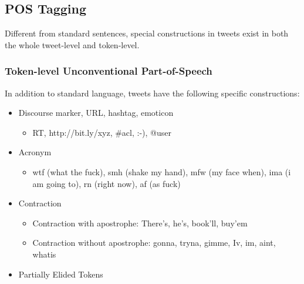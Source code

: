 \documentclass[11pt,letterpaper]{article}
\begin{document}
\subsection{POS Tagging}
Different from standard sentences, special constructions in tweets exist in both the whole tweet-level and token-level.

\subsubsection{Token-level Unconventional Part-of-Speech}
In addition to standard language, tweets have the following specific constructions:
\begin{itemize}
\item Discourse marker, URL, hashtag, emoticon
	\begin{itemize}
		\item RT, http://bit.ly/xyz, \#acl, :-), @user
	\end{itemize}
\item Acronym
	\begin{itemize}
		\item wtf (what the fuck), smh (shake my hand), mfw (my face when), ima (i am going to), rn (right now), af (as fuck)
	\end{itemize}
\item Contraction
	\begin{itemize}
		\item Contraction with apostrophe: There’s, he’s, book’ll, buy’em
		\item Contraction without apostrophe: gonna, tryna, gimme, Iv, im, aint, whatis
	\end{itemize}
\item Partially Elided Tokens
\end{itemize}
\end{document}
